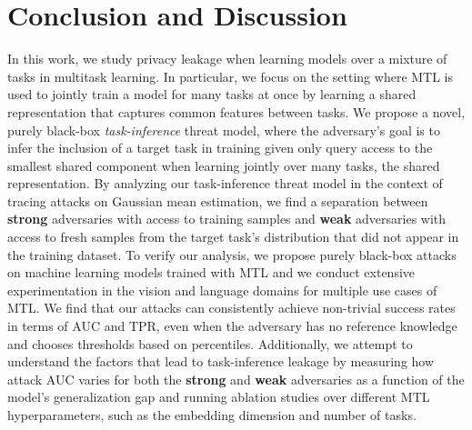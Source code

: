 \section{Conclusion and Discussion} \label{sec:discussion}

In this work, we study privacy leakage when learning models over a mixture of tasks in multitask learning. In particular, we focus on the setting where MTL is used to jointly train a model for many tasks at once by learning a shared representation that captures common features between tasks. We propose a novel, purely black-box \emph{task-inference} threat model, where the adversary's goal is to infer the inclusion of a target task in training given only query access to the smallest shared component when learning jointly over many tasks, the shared representation. By analyzing our task-inference threat model in the context of tracing attacks on Gaussian mean estimation, we find a separation between \textbf{strong} adversaries with access to training samples and \textbf{weak} adversaries with access to fresh samples from the target task's distribution that did not appear in the training dataset. To verify our analysis, we propose purely black-box attacks on machine learning models trained with MTL and we conduct extensive experimentation in the vision and language domains for multiple use cases of MTL. We find that our attacks can consistently achieve non-trivial success rates in terms of AUC and TPR, even when the adversary has no reference knowledge and chooses thresholds based on percentiles. Additionally, we attempt to understand the factors that lead to task-inference leakage by measuring how attack AUC varies for both the \textbf{strong} and \textbf{weak} adversaries as a function of the model's generalization gap and running ablation studies over different MTL hyperparameters, such as the embedding dimension and number of tasks.

